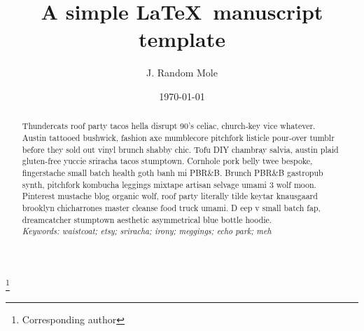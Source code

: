 \documentclass[aps,pre,twocolumn,nofootinbib,superscriptaddress,linenumbers,11point]{revtex4-1}
\begin{document}

\title{A simple \LaTeX\ manuscript template}

\author{J. Random Mole}
 \thanks{Corresponding author}

\date{\today}


\begin{abstract}

Thundercats roof party tacos hella disrupt 90's celiac, church-key vice whatever. 
Austin tattooed bushwick, fashion axe mumblecore pitchfork listicle pour-over tumblr before they sold out vinyl brunch shabby chic. Tofu DIY chambray salvia, austin plaid gluten-free yuccie sriracha tacos stumptown. Cornhole pork belly twee bespoke, fingerstache small batch health goth banh mi PBR\&B. 
Brunch PBR\&B gastropub synth, pitchfork kombucha leggings mixtape artisan selvage umami 3 wolf moon. Pinterest mustache blog organic wolf, roof party literally tilde keytar knausgaard brooklyn chicharrones master cleanse food truck umami. D
eep v small batch fap, dreamcatcher stumptown aesthetic asymmetrical blue bottle hoodie.\\

\emph{Keywords: waistcoat; etsy; sriracha; irony; meggings; echo park; meh}

\end{abstract}

\maketitle

\end{document}
